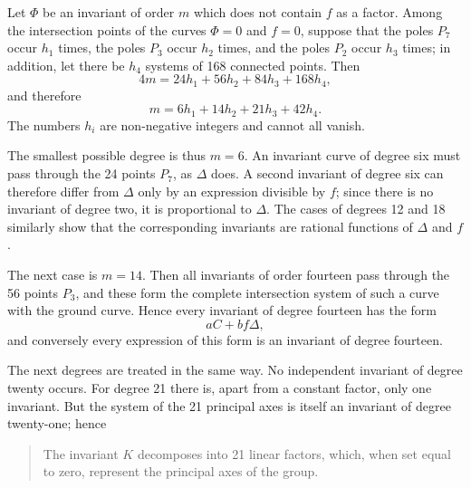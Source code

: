 \documentclass[11pt]{article}
\begin{document}
Let \(\Phi\) be an invariant of order \(m\) which does not contain \(f\) as a factor. Among the intersection points of the curves \(\Phi=0\) and \(f=0\), suppose that the poles \(P_7\) occur \(h_1\) times, the poles \(P_3\) occur \(h_2\) times, and the poles \(P_2\) occur \(h_3\) times; in addition, let there be \(h_4\) systems of 168 connected points. Then
\begin{equation}
4m=24h_1+56h_2+84h_3+168h_4,
\end{equation}
and therefore
\begin{equation}
m=6h_1+14h_2+21h_3+42h_4.
\tag{1}
\end{equation}
The numbers \(h_i\) are non-negative integers and cannot all vanish.

The smallest possible degree is thus \(m=6\). An invariant curve of degree six must pass through the 24 points \(P_7\), as \(\Delta\) does. A second invariant of degree six can therefore differ from \(\Delta\) only by an expression divisible by \(f\); since there is no invariant of degree two, it is proportional to \(\Delta\). The cases of degrees 12 and 18 similarly show that the corresponding invariants are rational functions of \(\Delta\) and \(f\).

The next case is \(m=14\). Then all invariants of order fourteen pass through the 56 points \(P_3\), and these form the complete intersection system of such a curve with the ground curve. Hence every invariant of degree fourteen has the form
\begin{equation}
aC+bf\Delta,
\end{equation}
and conversely every expression of this form is an invariant of degree fourteen.

The next degrees are treated in the same way. No independent invariant of degree twenty occurs. For degree 21 there is, apart from a constant factor, only one invariant. But the system of the 21 principal axes is itself an invariant of degree twenty-one; hence
\begin{quote}
The invariant \(K\) decomposes into 21 linear factors, which, when set equal to zero, represent the principal axes of the group.
\end{quote}
\end{document}
